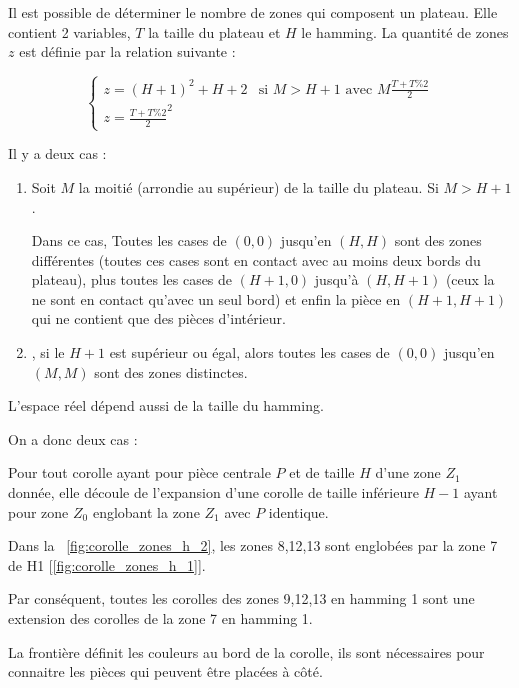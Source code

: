 	
	Il est possible de déterminer le nombre de zones qui composent un plateau. Elle contient 2 variables, $T$ la taille du plateau et $H$ le hamming. La quantité de zones $z$ est définie par la relation suivante :
	
	\[
		\begin{cases}
		z=(H+1)^2 + H+2 &\text{si } M > H+1  \text{ avec } M\frac{T + T\%2}{2}\\
		z= \frac{T + T\%2}{2}^2&
		\end{cases}	
	\]
	
	Il y a deux cas :
	
	\begin{enumerate}
		\item Soit  $M$ la moitié (arrondie au supérieur) de la taille du plateau. Si $M> H+1$.
		
		Dans ce cas, Toutes les cases de $(0,0)$ jusqu'en $(H,H)$ sont des zones différentes (toutes ces cases sont en contact avec au moins deux bords du plateau), plus toutes les cases de $(H+1,0)$ jusqu'à $(H,H+1)$ (ceux la ne sont en contact qu'avec un seul bord) et enfin la pièce en $(H+1,H+1)$ qui ne contient que des pièces d'intérieur.
		
		\item, si le $H+1$ est supérieur ou égal, alors toutes les cases de $(0,0)$ jusqu'en $(M,M)$ sont des zones distinctes.
	\end{enumerate}
	
	
	L'espace réel dépend aussi de la taille du hamming.
	
	On a donc deux cas : 
	
	\begin{defn}
	Pour tout corolle ayant pour pièce centrale $P$ et de taille $H$ d'une zone $Z_1$ donnée, elle découle de l'expansion d'une corolle de
	taille inférieure $H-1$ ayant pour zone $Z_0$ englobant la zone $Z_1$ avec $P$ identique.
	\end{defn}
	\begin{exmp}
		Dans la ~\autoref{fig:corolle_zones_h_2}, les zones 8,12,13 sont englobées par la zone 7 de H1 [\autoref{fig:corolle_zones_h_1}].
		
		Par conséquent, toutes les corolles des zones 9,12,13 en hamming 1 sont une extension des corolles de la zone 7 en hamming 1.
	\end{exmp}

	La frontière définit les couleurs au bord de la corolle, ils sont nécessaires pour connaitre les pièces qui peuvent être placées à côté.
	
